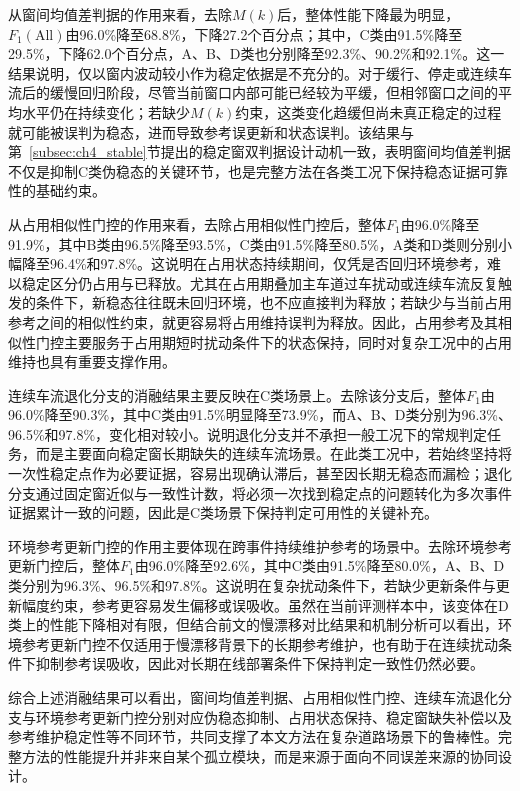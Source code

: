 \documentclass{xdupgthesis}
\begin{document}
从窗间均值差判据的作用来看，去除$M(k)$后，整体性能下降最为明显，$F_1(\mathrm{All})$由96.0\%降至68.8\%，下降27.2个百分点；其中，C类由91.5\%降至29.5\%，下降62.0个百分点，A、B、D类也分别降至92.3\%、90.2\%和92.1\%。这一结果说明，仅以窗内波动较小作为稳定依据是不充分的。对于缓行、停走或连续车流后的缓慢回归阶段，尽管当前窗口内部可能已经较为平缓，但相邻窗口之间的平均水平仍在持续变化；若缺少$M(k)$约束，这类变化趋缓但尚未真正稳定的过程就可能被误判为稳态，进而导致参考误更新和状态误判。该结果与第~\ref{subsec:ch4_stable}节提出的稳定窗双判据设计动机一致，表明窗间均值差判据不仅是抑制C类伪稳态的关键环节，也是完整方法在各类工况下保持稳态证据可靠性的基础约束。

从占用相似性门控的作用来看，去除占用相似性门控后，整体$F_1$由96.0\%降至91.9\%，其中B类由96.5\%降至93.5\%，C类由91.5\%降至80.5\%，A类和D类则分别小幅降至96.4\%和97.8\%。这说明在占用状态持续期间，仅凭是否回归环境参考，难以稳定区分仍占用与已释放。尤其在占用期叠加主车道过车扰动或连续车流反复触发的条件下，新稳态往往既未回归环境，也不应直接判为释放；若缺少与当前占用参考之间的相似性约束，就更容易将占用维持误判为释放。因此，占用参考及其相似性门控主要服务于占用期短时扰动条件下的状态保持，同时对复杂工况中的占用维持也具有重要支撑作用。

连续车流退化分支的消融结果主要反映在C类场景上。去除该分支后，整体$F_1$由96.0\%降至90.3\%，其中C类由91.5\%明显降至73.9\%，而A、B、D类分别为96.3\%、96.5\%和97.8\%，变化相对较小。说明退化分支并不承担一般工况下的常规判定任务，而是主要面向稳定窗长期缺失的连续车流场景。在此类工况中，若始终坚持将一次性稳定点作为必要证据，容易出现确认滞后，甚至因长期无稳态而漏检；退化分支通过固定窗近似与一致性计数，将必须一次找到稳定点的问题转化为多次事件证据累计一致的问题，因此是C类场景下保持判定可用性的关键补充。

环境参考更新门控的作用主要体现在跨事件持续维护参考的场景中。去除环境参考更新门控后，整体$F_1$由96.0\%降至92.6\%，其中C类由91.5\%降至80.0\%，A、B、D类分别为96.3\%、96.5\%和97.8\%。这说明在复杂扰动条件下，若缺少更新条件与更新幅度约束，参考更容易发生偏移或误吸收。虽然在当前评测样本中，该变体在D类上的性能下降相对有限，但结合前文的慢漂移对比结果和机制分析可以看出，环境参考更新门控不仅适用于慢漂移背景下的长期参考维护，也有助于在连续扰动条件下抑制参考误吸收，因此对长期在线部署条件下保持判定一致性仍然必要。

综合上述消融结果可以看出，窗间均值差判据、占用相似性门控、连续车流退化分支与环境参考更新门控分别对应伪稳态抑制、占用状态保持、稳定窗缺失补偿以及参考维护稳定性等不同环节，共同支撑了本文方法在复杂道路场景下的鲁棒性。完整方法的性能提升并非来自某个孤立模块，而是来源于面向不同误差来源的协同设计。
\end{document}

